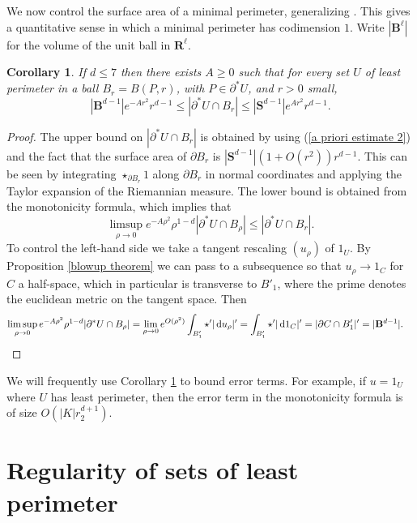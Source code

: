 \documentclass[reqno,10pt]{amsart}
\newcommand{\RR}{\mathbf{R}}
\newcommand{\Sph}{\mathbf S}
\newcommand{\Ball}{\mathbf{B}}
\newcommand*\dif{\mathop{}\!\mathrm{d}}
\newtheorem{corollary}[theorem]{Corollary}
\theoremstyle{definition}
\numberwithin{equation}{section}
\begin{document}
We now control the surface area of a minimal perimeter, generalizing \cite[Remark 5.13]{Giusti77}.
This gives a quantitative sense in which a minimal perimeter has codimension $1$.
Write $|\Ball^\ell|$ for the volume of the unit ball in $\RR^\ell$.

\begin{corollary}\label{doubling dimension}
If $d \leq 7$ then there exists $A \geq 0$ such that for every set $U$ of least perimeter in a ball $B_r = B(P, r)$, with $P \in \partial^* U$, and $r > 0$ small,
$$|\Ball^{d - 1}|e^{-Ar^2}r^{d - 1} \leq |\partial^*U \cap B_r| \leq |\Sph^{d - 1}|e^{Ar^2} r^{d - 1}.$$
\end{corollary}
\begin{proof}
The upper bound on $|\partial^* U \cap B_r|$ is obtained by using (\ref{a priori estimate 2}) and the fact that the surface area of $\partial B_r$ is $|\Sph^{d - 1}|(1 + O(r^2))r^{d - 1}$.
This can be seen by integrating $\star_{\partial B_r} 1$ along $\partial B_r$ in normal coordinates and applying the Taylor expansion of the Riemannian measure.
The lower bound is obtained from the monotonicity formula, which implies that
$$\limsup_{\rho \to 0} e^{-A\rho^2} \rho^{1 - d} |\partial^* U \cap B_\rho| \leq |\partial^* U \cap B_r|.$$
To control the left-hand side we take a tangent rescaling $(u_\rho)$ of $1_U$.
By Proposition \ref{blowup theorem} we can pass to a subsequence so that $u_\rho \to 1_C$ for $C$ a half-space, which in particular is transverse to $B'_1$, where the prime denotes the euclidean metric on the tangent space.
Then
\begin{align*}
\limsup_{\rho \to 0} e^{-A\rho^2} \rho^{1 - d} |\partial^* U \cap B_\rho| &= \lim_{\rho \to 0} e^{O(\rho^2)} \int_{B'_1} \star'|\dif u_\rho|' = \int_{B'_1} \star'|\dif 1_C|' = |\partial C \cap B'_1|' = |\Ball^{d - 1}|. \qedhere
\end{align*}
\end{proof}

We will frequently use Corollary \ref{doubling dimension} to bound error terms.
For example, if $u = 1_U$ where $U$ has least perimeter, then the error term in the monotonicity formula is of size $O(|K|r_2^{d + 1})$.



\section{Regularity of sets of least perimeter}\label{Plateau section}
\end{document}

